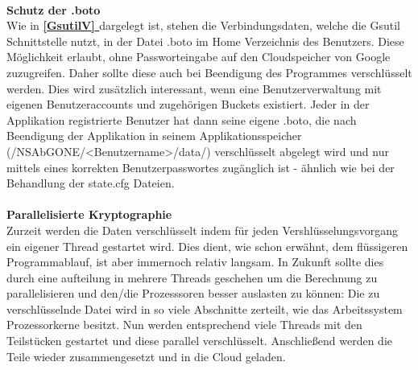 \documentclass[13pt,a4paper,bibliography=totocnumbered,listof=totocnumbered]{scrartcl}
\newcommand*{\fullref}[1]{\textbf{\hyperref[{#1}]{\ref*{#1} \nameref*{#1}}}}
\begin{document}
\\\textbf{Schutz der .boto}\\
Wie in \fullref{GsutilV} dargelegt ist, stehen die Verbindungsdaten, welche die Gsutil Schnittstelle nutzt, in der Datei .boto im Home Verzeichnis des Benutzers. Diese Möglichkeit erlaubt, ohne Passworteingabe auf den Cloudspeicher von Google zuzugreifen. Daher sollte diese auch bei Beendigung des Programmes verschlüsselt werden. Dies wird zusätzlich interessant, wenn eine Benutzerverwaltung mit eigenen Benutzeraccounts und zugehörigen Buckets existiert. Jeder in der Applikation registrierte Benutzer hat dann seine eigene .boto, die nach Beendigung der Applikation in seinem Applikationsspeicher (/NSAbGONE/\textless Benutzername\textgreater /data/) verschlüsselt abgelegt wird und nur mittels eines korrekten Benutzerpasswortes zugänglich ist - ähnlich wie bei der Behandlung der state.cfg Dateien.\\
\\\textbf{Parallelisierte Kryptographie}\\
Zurzeit werden die Daten verschlüsselt indem für jeden Vershlüsselungsvorgang ein eigener Thread gestartet wird. Dies dient, wie schon erwähnt, dem flüssigeren Programmablauf, ist aber immernoch relativ langsam. In Zukunft sollte dies durch eine aufteilung in mehrere Threads geschehen um die Berechnung zu parallelisieren und den/die Prozesssoren besser auslasten zu können: Die zu verschlüsselnde Datei wird in so viele Abschnitte zerteilt, wie das Arbeitssystem Prozessorkerne besitzt. Nun werden entsprechend viele Threads mit den Teilstücken gestartet und diese parallel verschlüsselt. Anschließend werden die Teile wieder zusammengesetzt und in die Cloud geladen.
\end{document}
